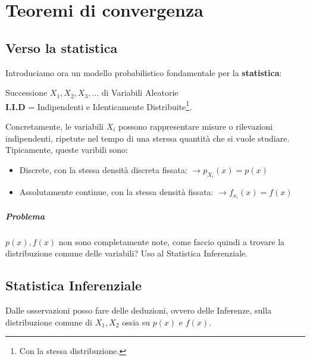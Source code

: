 \chapter{Teoremi di convergenza}

\raggedbottom

\section{Verso la statistica}
Introduciamo ora un modello probabilistico fondamentale per la \textbf{statistica}:
\begin{center}
    Successione $X_1,X_2,X_3,...$ di Variabili Aleatorie
    \\\textbf{I.I.D} = Indipendenti e Identicamente Distribuite\footnote{Con la stessa distribuzione.}.
\end{center}
Concretamente, le variabili $X_i$ possono rappresentare misure o rilevazioni indipendenti, ripetute nel tempo di una sterssa quantità che si vuole studiare.
Tipicamente, queste varibili sono:
\begin{itemize}
    \item Discrete, con la stessa densità discreta fissata: $ \rightarrow p_{X_i}(x) = p(x) $
    \item Assolutamente continue, con la stessa densità fissata: $ \rightarrow f_{x_i} (x) = f(x)$
\end{itemize}

\paragraph{Problema} $p(x), f(x)$ non sono completamente note, come faccio quindi a trovare la distribuzione comune delle variabili?
Uso al Statistica Inferenziale.
\section{Statistica Inferenziale} 
Dalle osservazioni posso fare delle deduzioni, ovvero delle Inferenze, sulla distribuzione
comune di $X_1, X_2$ ossia su $p(x)$ e $f(x)$.

